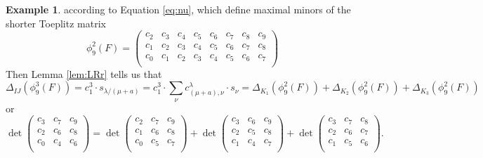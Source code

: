 \documentclass[unnumsec,webpdf,modern,medium]{oup-authoring-template}
\theoremstyle{theorem}
\theoremstyle{definition}
\newtheorem{example}[theorem]{Example}
\begin{document}
\begin{example}
	according to Equation \eqref{eq:nu},
	which define maximal minors of the shorter Toeplitz matrix 
	$$\phi^2_9(F)=\left(\begin{array}{cccccccc}
		c_2 & c_3 & c_4 & c_5 & c_6 & c_7 & c_8 & c_9\\
		c_1 & c_2 & c_3 & c_4 & c_5 & c_6 & c_7 & c_8\\
		c_0 & c_1 & c_2 & c_3 & c_4 & c_5 & c_6 & c_7\\ \end{array}\right)$$
	Then Lemma \ref{lem:LRr} tells us that 
	$$\Delta_{IJ}(\phi^3_9(F))=c_1^{3}\cdot s_{\lambda/(\mu+a)}=c_1^3\cdot \sum_{\nu}c^{\lambda}_{(\mu+a), \nu}\cdot s_\nu=\Delta_{K_1}(\phi^2_9(F))+\Delta_{K_2}(\phi^2_9(F))+\Delta_{K_3}(\phi^2_9(F))$$
	or 
	$$\det\left(\begin{array}{ccc}
		c_3 & c_7 & c_9\\
		c_2 & c_6 & c_8\\
		c_0 & c_4 & c_6\\
	\end{array}\right)=\det\left(\begin{array}{ccc}
		c_2 & c_7 & c_9\\
		c_1 & c_6 & c_8\\
		c_0 & c_5 & c_7\\ \end{array}\right)+\det\left(\begin{array}{ccc} c_3 & c_6 & c_9\\ 
		c_2 & c_5 & c_8\\
		c_1 & c_4 & c_7\\ \end{array}\right)+
	\det\left(\begin{array}{ccc}
		c_3 & c_7 & c_8\\
		c_2 & c_6 & c_7\\ 
		c_1 & c_5 & c_6\\ \end{array}\right).$$
\end{example}
\end{document}
